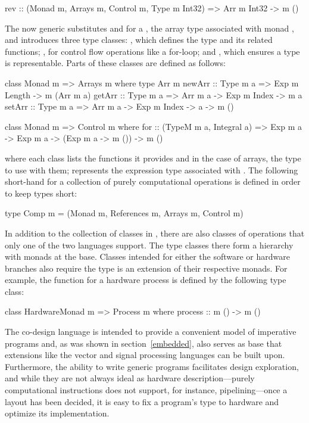 \documentclass[../paper.tex]{subfiles}
\begin{document}
\begin{code}
rev :: (Monad m, Arrays m, Control m, Type m Int32) => Arr m Int32 -> m ()
\end{code}

\noindent The now generic  substitutes  and  for a , the array type associated with monad , and introduces three type classes: , which defines the  type and its related functions; , for control flow operations like a for-loop; and , which ensures a type is representable. Parts of these classes are defined as follows:

\begin{code}
class Monad m => Arrays m where
  type Arr m
  newArr :: Type m a => Exp m Length -> m (Arr m a)
  getArr :: Type m a => Arr m a -> Exp m Index -> m a
  setArr :: Type m a => Arr m a -> Exp m Index -> a -> m ()

class Monad m => Control m where
  for :: (TypeM m a, Integral a) => Exp m a -> Exp m a -> (Exp m a -> m ())
      -> m ()
\end{code}

\noindent where each class lists the functions it provides and in the case of arrays, the type to use with them;  represents the expression type associated with . The following short-hand for a collection of purely computational operations is defined in order to keep types short:

\begin{code}
type Comp m = (Monad m, References m, Arrays m, Control m)
\end{code}

In addition to the collection of classes in , there are also classes of operations that only one of the two languages support. The type classes there form a hierarchy with monads at the base. Classes intended for either the software or hardware branches also require the type is an extension of their respective monads. For example, the function for a hardware process is defined by the following type class:

\begin{code}
class HardwareMonad m => Process m where
  process :: m () -> m ()
\end{code}

The co-design language is intended to provide a convenient model of imperative programs and, as was shown in section~\ref{embedded}, also serves as base that extensions like the vector and signal processing languages can be built upon. Furthermore, the ability to write generic programs facilitates design exploration, and while they are not always ideal as hardware description---purely computational instructions does not support, for instance, pipelining---once a layout has been decided, it is easy to fix a program's type to hardware and optimize its implementation.
\end{document}
